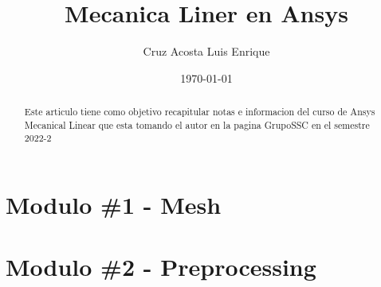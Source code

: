 \documentclass{article}
\title{Mecanica Liner en Ansys}
\author{Cruz Acosta Luis Enrique}
\date{\today}
\begin{document}
 
\maketitle

\tableofcontents

\begin{abstract}
    Este articulo tiene como objetivo recapitular notas e informacion 
    del curso de Ansys Mecanical Linear que esta tomando el autor en la pagina
    GrupoSSC en el semestre 2022-2
\end{abstract}

\newpage

\section{Modulo \#1 - Mesh}

\section{Modulo \#2 - Preprocessing}
\end{document}
